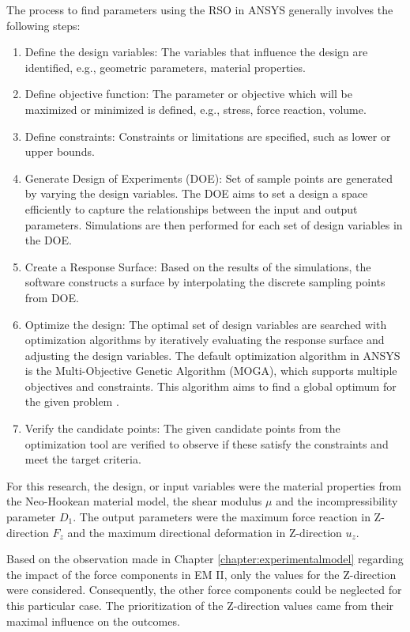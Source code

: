 The process to find parameters using the RSO in ANSYS generally involves the following steps:
\begin{enumerate}
    \item Define the design variables: The variables that influence the design are identified, e.g., geometric parameters, material properties.
    \item Define objective function: The parameter or objective which will be maximized or minimized is defined, e.g., stress, force reaction, volume. 
    \item Define constraints: Constraints or limitations are specified, such as lower or upper bounds.
    \item Generate Design of Experiments (DOE): Set of sample points are generated by varying the design variables. The DOE aims to set a design a space efficiently to capture the relationships between the input and output parameters. Simulations are then performed for each set of design variables in the DOE.  
    \item Create a Response Surface: Based on the results of the simulations, the software constructs a surface by interpolating the discrete sampling points from DOE.
    \item Optimize the design: The optimal set of design variables are searched with optimization algorithms by iteratively evaluating the response surface and adjusting the design variables. The default optimization algorithm in ANSYS is the Multi-Objective Genetic Algorithm (MOGA), which supports multiple objectives and constraints. This algorithm aims to find a global optimum for the given problem \cite{Grebenisan2017}.
    \item Verify the candidate points: The given candidate points from the optimization tool are verified to observe if these satisfy the constraints and meet the target criteria.
\end{enumerate}

For this research, the design, or input variables were the material properties from the Neo-Hookean 
material model, the shear modulus $\mu$ and the incompressibility parameter $D_1$. The output parameters 
were the maximum force reaction in Z-direction $F_z$ and the maximum directional deformation in Z-direction $u_z$.

Based on the observation made in Chapter \ref{chapter:experimentalmodel} regarding the impact of the force 
components in EM II, only the values for the Z-direction were considered. Consequently, the other force 
components could be neglected for this particular case. The prioritization of the Z-direction values came from 
their maximal influence on the outcomes.

